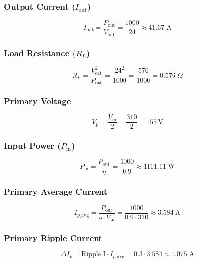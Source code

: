 \subsubsection*{Output Current (\(I_{\text{out}}\))}
\begin{equation}
I_{\text{out}} = \frac{P_{\text{out}}}{V_{\text{out}}} = \frac{1000}{24} \approx \boxed{41.67\;\text{A}}
\end{equation}

\subsubsection*{Load Resistance (\(R_L\))}
\begin{equation}
R_L = \frac{V_{\text{out}}^2}{P_{\text{out}}} = \frac{24^2}{1000} = \frac{576}{1000} = \boxed{0.576\;\Omega}
\end{equation}

\subsubsection*{Primary Voltage}
\begin{equation}
 V_p = \frac{V_{\text{in}}}{2} = \frac{310}{2} = \boxed{155\,\text{V}}
\end{equation}

\subsubsection*{Input Power (\(P_{\text{in}}\))}
\begin{equation}
P_{\text{in}} = \frac{P_{\text{out}}}{\eta} = \frac{1000}{0.9} \approx \boxed{1111.11\;\text{W}}
\end{equation}

\subsubsection*{Primary Average Current}
\begin{equation}
I_{p\_\text{avg}} = \frac{P_{\text{out}}}{\eta \cdot V_{\text{in}}} = \frac{1000}{0.9 \cdot 310} \approx \boxed{3.584\;\text{A}}
\end{equation}

\subsubsection*{Primary Ripple Current}
\begin{equation}
\Delta I_p = \text{Ripple\_I} \cdot I_{p\_\text{avg}} = 0.3 \cdot 3.584 \approx \boxed{1.075\;\text{A}}
\end{equation}

